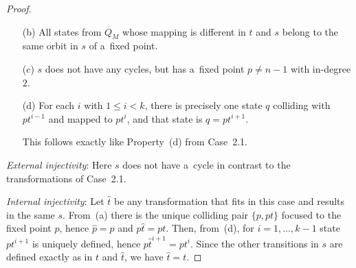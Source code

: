 \documentclass{amsart}
\renewcommand{\le}{\leqslant}
\newcommand{\e}[1]{\hat{#1}}
\begin{document}
\begin{proof}
\begin{enumerate}
\item[(b)] All states from $Q_M$ whose mapping is different in $t$ and $s$ belong to the same orbit in $s$ of a~fixed point.

\item[(c)] $s$ does not have any cycles, but has a~fixed point $p \neq n-1$ with in-degree $2$.

\item[(d)] For each $i$ with $1 \le i < k$, there is precisely one state $q$ colliding with $pt^{i-1}$ and mapped to $pt^i$, and that state is $q=pt^{i+1}$.

This follows exactly like Property~(d) from Case~2.1.
\end{enumerate}

\textit{External injectivity}:
Here $s$ does not have a~cycle in contrast to the transformations of Case~2.1.

\textit{Internal injectivity}:
Let $\e{t}$ be any transformation that fits in this case and results in the same $s$.
From~(a) there is the unique colliding pair $\{p,pt\}$ focused to the fixed point $p$, hence $\e{p} = p$ and $p\e{t} = pt$.
Then, from~(d), for $i=1,\ldots,k-1$ state $pt^{i+1}$ is uniquely defined, hence $p\e{t}^{i+1} = pt^i$.
Since the other transitions in $s$ are defined exactly as in $t$ and $\e{t}$, we have $\e{t} = t$.


\end{proof}
\end{document}
